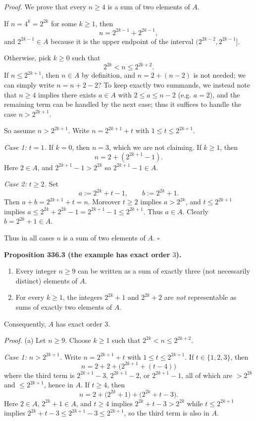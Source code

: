 \noindent\emph{Proof.}
We prove that every $n\ge 4$ is a sum of two elements of $A$.

If $n=4^k=2^{2k}$ for some $k\ge 1$, then
\[
 n=2^{2k-1}+2^{2k-1},
\]
and $2^{2k-1}\in A$ because it is the upper endpoint of the interval $(2^{2k-2},2^{2k-1}]$.

Otherwise, pick $k\ge 0$ such that
\[
2^{2k} < n \le 2^{2k+2}.
\]
If $n\le 2^{2k+1}$, then $n\in A$ by definition, and $n=2+(n-2)$ is not needed; we can simply write $n=n+2-2$? To keep exactly two summands, we instead note that $n\ge 4$ implies there exists $a\in A$ with $2\le a\le n-2$ (e.g. $a=2$), and the remaining term can be handled by the next case; thus it suffices to handle the case $n>2^{2k+1}$.

So assume $n>2^{2k+1}$. Write $n=2^{2k+1}+t$ with $1\le t\le 2^{2k+1}$.

\emph{Case 1: $t=1$.}
If $k=0$, then $n=3$, which we are not claiming. If $k\ge 1$, then
\[
 n=2 + (2^{2k+1}-1).
\]
Here $2\in A$, and $2^{2k+1}-1>2^{2k}$ so $2^{2k+1}-1\in A$.

\emph{Case 2: $t\ge 2$.}
Set
\[
 a:=2^{2k}+t-1,\qquad b:=2^{2k}+1.
\]
Then $a+b=2^{2k+1}+t=n$. Moreover $t\ge 2$ implies $a>2^{2k}$, and $t\le 2^{2k+1}$ implies
$a\le 2^{2k}+2^{2k}-1=2^{2k+1}-1\le 2^{2k+1}$. Thus $a\in A$. Clearly $b=2^{2k}+1\in A$.

Thus in all cases $n$ is a sum of two elements of $A$.
\hfill$\square$

\medskip
\noindent\textbf{Proposition 336.3 (the example has exact order $3$).}

\begin{enumerate}
\item[(a)] Every integer $n\ge 9$ can be written as a sum of exactly three (not necessarily distinct) elements of $A$.
\item[(b)] For every $k\ge 1$, the integers $2^{2k}+1$ and $2^{2k}+2$ are \emph{not} representable as sums of exactly two elements of $A$.
\end{enumerate}
Consequently, $A$ has exact order $3$.

\noindent\emph{Proof.}
(a) Let $n\ge 9$.
Choose $k\ge 1$ such that $2^{2k}<n\le 2^{2k+2}$.

\emph{Case 1: $n>2^{2k+1}$.}
Write $n=2^{2k+1}+t$ with $1\le t\le 2^{2k+1}$.
If $t\in\{1,2,3\}$, then
\[
 n = 2+2+\bigl(2^{2k+1}+(t-4)\bigr)
\]
where the third term is $2^{2k+1}-3$, $2^{2k+1}-2$, or $2^{2k+1}-1$, all of which are $>2^{2k}$ and $\le 2^{2k+1}$, hence in $A$.
If $t\ge 4$, then
\[
 n = 2 + \bigl(2^{2k}+1\bigr) + \bigl(2^{2k}+t-3\bigr).
\]
Here $2\in A$, $2^{2k}+1\in A$, and $t\ge 4$ implies $2^{2k}+t-3>2^{2k}$ while $t\le 2^{2k+1}$ implies $2^{2k}+t-3\le 2^{2k+1}-3\le 2^{2k+1}$, so the third term is also in $A$.

